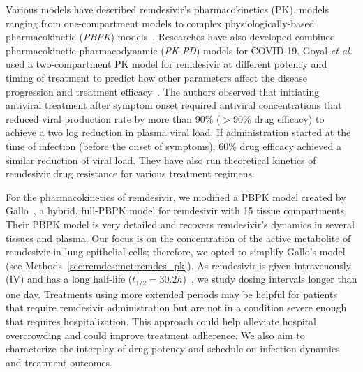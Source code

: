 Various models have described remdesivir's pharmacokinetics (PK), models ranging from one-compartment models to complex physiologically-based pharmacokinetic (\emph{PBPK}) models~\cite{gallo_hybrid_2021, humeniuk_safety_2020, cao_remdesivir_2020}. Researches have also developed combined phar\-ma\-co\-ki\-ne\-tic-phar\-ma\-co\-dy\-na\-mic (\emph{PK-PD}) models for COVID-19. Goyal \emph{et al.} used a two-compartment PK model for remdesivir at different potency and timing of treatment to predict how other parameters affect the disease progression and treatment efficacy~\cite{goyal_potency_2020, goyal_mathematical_2020}. The authors observed that initiating antiviral treatment after symptom onset required antiviral concentrations that reduced viral production rate by more than 90\% ($>$90\% drug efficacy) to achieve a two log reduction in plasma viral load. If administration started at the time of infection (before the onset of symptoms), 60\% drug efficacy achieved a similar reduction of viral load. They have also run theoretical kinetics of remdesivir drug resistance for various treatment regimens.

For the pharmacokinetics of remdesivir, we modified a PBPK model created by Gallo~\cite{gallo_hybrid_2021}, a hybrid, full-PBPK model for remdesivir with 15 tissue compartments. Their PBPK model is very detailed and recovers remdesivir's dynamics in several tissues and plasma. Our focus is on the concentration of the active metabolite of remdesivir in lung epithelial cells; therefore, we opted to simplify Gallo's model (see Methods~\ref{sec:remdes:met:remdes_pk}). As remdesivir is given intravenously (IV) and has a long half-life ($t_{1/2} = 30.2h$)~\cite{humeniuk_safety_2020}, we study dosing intervals longer than one day. Treatments using more extended periods may be helpful for patients that require remdesivir administration but are not in a condition severe enough that requires hospitalization. This approach could help alleviate hospital overcrowding and could improve treatment adherence. We also aim to characterize the interplay of drug potency and schedule on infection dynamics and treatment outcomes.

